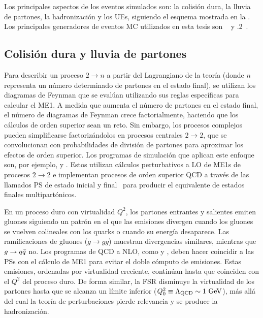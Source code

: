 Los principales aspectos de los eventos simulados son: la colisi\'on dura, la lluvia de partones, la hadronización y los \acp{UE}, siguiendo el esquema mostrada en la \Fig{\ref{fig:theory:sm:hadron_interactions:parton_shower}}.
Los principales generadores de eventos \ac{MC} utilizados en esta tesis son ~\cite{Pythia8.1,Pythia8.2,Pythia8.3} y .2~\cite{Sherpa2.2}.

\subsection{Colisi\'on dura y lluvia de partones}

Para describir un proceso \(2 \to n\) a partir del Lagrangiano de la teoría (donde \(n\) representa un número determinado de partones en el estado final), se utilizan los diagramas de Feynman que se evalúan utilizando sus reglas específicas para calcular el \ac{ME1}. A medida que aumenta el número de partones en el estado final, el número de diagramas de Feynman crece factorialmente, haciendo que los cálculos de orden superior sean un reto. Sin embargo, los procesos complejos pueden simplificarse factorizándolos en procesos centrales \(2 \to 2\), que se convolucionan con probabilidades de división de partones para aproximar los efectos de orden superior. Los programas de simulación que aplican este enfoque son, por ejemplo, \pythia y \Herwig. Estos utilizan cálculos perturbativos a \ac{LO} de \acp{ME1} de procesos \(2 \to 2\) e implementan procesos de orden superior \ac{QCD} a través de las llamados \ac{PS} de estado inicial y final~\cite{Sjostrand-2006,Dobbs-2004} para producir el equivalente de estados finales multipartónicos.

En un proceso duro con virtualidad \(Q^2\), los partones entrantes y salientes emiten gluones siguiendo un patrón en el que las emisiones divergen cuando los gluones se vuelven colineales con los quarks o cuando su energía desaparece. Las ramificaciones de gluones (\(g \to gg\)) muestran divergencias similares, mientras que \(g \rightarrow q\bar{q}\) no. Los programas de \ac{QCD} a \ac{NLO}, como \Sherpa y \POWHEG, deben hacer coincidir a las \acp{PS} con el cálculo de \ac{ME1} para evitar el doble cómputo de emisiones. Estas emisiones, ordenadas por virtualidad creciente, continúan hasta que coinciden con el \(Q^2\) del proceso duro. De forma similar, la \ac{FSR} disminuye la virtualidad de los partones hasta que se alcanza un límite inferior (\(Q^2_0 \equiv \Lambda_{\text{QCD}} \sim 1~\text{GeV}\)), más allá del cual la teoría de perturbaciones pierde relevancia y se produce la hadronización.


